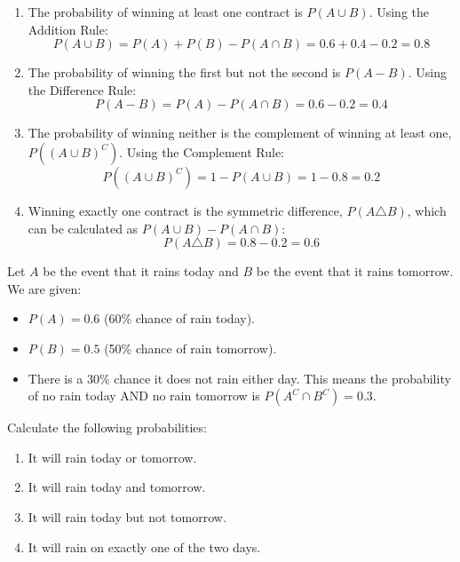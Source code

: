 \begin{solution}
    \begin{enumerate}[label=(\alph*)]
        \item The probability of winning at least one contract is $P(A \cup B)$. Using the Addition Rule:
        \[ P(A \cup B) = P(A) + P(B) - P(A \cap B) = 0.6 + 0.4 - 0.2 = 0.8 \]
        
        \item The probability of winning the first but not the second is $P(A - B)$. Using the Difference Rule:
        \[ P(A - B) = P(A) - P(A \cap B) = 0.6 - 0.2 = 0.4 \]
        
        \item The probability of winning neither is the complement of winning at least one, $P((A \cup B)^C)$. Using the Complement Rule:
        \[ P((A \cup B)^C) = 1 - P(A \cup B) = 1 - 0.8 = 0.2 \]
        
        \item Winning exactly one contract is the symmetric difference, $P(A \triangle B)$, which can be calculated as $P(A \cup B) - P(A \cap B)$:
        \[ P(A \triangle B) = 0.8 - 0.2 = 0.6 \]
    \end{enumerate}
\end{solution}

\begin{example}
    Let $A$ be the event that it rains today and $B$ be the event that it rains tomorrow. We are given:
    \begin{itemize}
        \item $P(A) = 0.6$ (60\% chance of rain today).
        \item $P(B) = 0.5$ (50\% chance of rain tomorrow).
        \item There is a 30\% chance it does not rain either day. This means the probability of no rain today AND no rain tomorrow is $P(A^C \cap B^C) = 0.3$.
    \end{itemize}
    
    Calculate the following probabilities:
    \begin{enumerate}[label=(\alph*)]
        \item It will rain today or tomorrow.
        \item It will rain today and tomorrow.
        \item It will rain today but not tomorrow.
        \item It will rain on exactly one of the two days.
    \end{enumerate}
\end{example}
    
